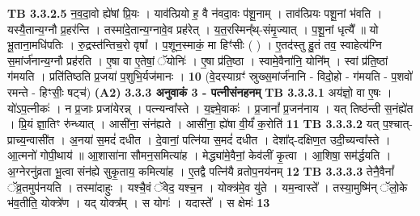 \documentclass[17pt]{extarticle}
\begin{document}
{{{{{{{{{{{{{{{{{{{                  \newline
                                \textbf{ TB 3.3.2.5} \newline
                  न॒व॒दा॒वो ह्ये॑षां प्रि॒यः । याव॑त्प्रियो ह॒ वै न॑वदा॒वः प॑शू॒नाम् । ताव॑त्प्रियः पशू॒नां भ॑वति । यस्यै॒तान्य॒ग्नौ प्र॒हर॑न्ति । तस्मा॑दे॒तान्य॒ग्नावे॒व प्रह॑रेत् । य॒त॒रस्मिन्᳚थ्-संमृ॒ज्यात् । प॒शू॒नां धृत्यै᳚ ॥ यो भू॒ताना॒मधि॑पतिः । रु॒द्रस्त॑न्तिच॒रो वृषा᳚ । प॒शून॒स्माकं॒ मा हिꣳ॑सीः ( ) । ए॒तद॑स्तु हु॒तं तव॒ स्वाहेत्य॑ग्नि स॒मांर्ज॑नान्य॒ग्नौ प्रह॑रति । ए॒षा वा ए॒तेषां॒ ॅयोनिः॑ । ए॒षा प्र॑ति॒ष्ठा । स्वामे॒वैना॑नि॒ योनि᳚म् । स्वां प्र॑ति॒ष्ठां ग॑मयति । प्रति॑तिष्ठति प्र॒जया॑ प॒शुभि॒र्यज॑मानः । \textbf{ 10} \newline
                  \newline
                                    (वे॒दस्याग्रꣳ॑ स्रुख्स॒मांर्ज॑नानि - विदो॒हो - ग॑मयति - प॒शवो॑ रमन्ते - हिꣳसीः॒ षट्च॑) \textbf{(A2)} \newline \newline
                \textbf{ 3.3.3     अनुवाकं   3 - पत्नीसंनहनम्} \newline
                                \textbf{ TB 3.3.3.1} \newline
                  अय॑ज्ञो॒ वा ए॒षः । यो॑ऽप॒त्नीकः॑ । न प्र॒जाः प्रजा॑येरन्न् । पत्न्यन्वा᳚स्ते । य॒ज्ञ्मे॒वाकः॑ । प्र॒जानां᳚ प्र॒जन॑नाय । यत् तिष्ठ॑न्ती स॒नंह्ये॑त । प्रि॒यं ज्ञा॒तिꣳ रु॑न्ध्यात् । आसी॑ना॒ संन॑ह्यते । आसी॑ना॒ ह्ये॑षा वी॒र्यं॑ क॒रोति॑ \textbf{ 11} \newline
                  \newline
                                \textbf{ TB 3.3.3.2} \newline
                  यत् प॒श्चात्-प्राच्य॒न्वासी॑त । अ॒नया॑ स॒मदं॑ दधीत । दे॒वानां॒ पत्नि॑या स॒मदं॑ दधीत । देशा᳚द्-दक्षिण॒त उदी॒च्यन्वा᳚स्ते । आ॒त्मनो॑ गोपी॒थाय॑ ॥ आ॒शासा॑ना सौमन॒समित्या॑ह । मेद्ध्या॑मे॒वैनां॒ केव॑लीं कृ॒त्वा । आ॒शिषा॒ सम॑र्द्धयति । अ॒ग्नेरनु॑व्रता भू॒त्वा संन॑ह्ये सुकृ॒ताय॒ कमित्या॑ह । ए॒तद्वै पत्नि॑यै व्रतोप॒नय॑नम् \textbf{ 12} \newline
                  \newline
                                \textbf{ TB 3.3.3.3} \newline
                  तेनै॒वैनां᳚ ॅव्र॒तमुप॑नयति । तस्मा॑दाहुः । यश्चै॒वं ॅवेद॒ यश्च॒न । योक्त्र॑मे॒व यु॑ते । यम॒न्वास्ते᳚ । तस्या॒मुष्मि॑न् ॅलो॒के भ॑व॒तीति॒ योक्त्रे॑ण । यद् योक्त्र᳚म् । स योगः॑ । यदास्ते᳚ । स क्षेमः॑ \textbf{ 13} \newline
                  \newline
}}}}}}}}}}}}}}}}}}}
\end{document}
